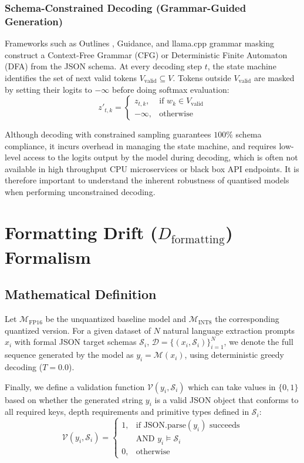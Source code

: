 \documentclass[10pt,journal,compsoc]{IEEEtran}
\begin{document}
\subsubsection{Schema-Constrained Decoding (Grammar-Guided Generation)}
Frameworks such as Outlines \cite{willard2023outlines}, Guidance, and llama.cpp grammar masking construct a Context-Free Grammar (CFG) or Deterministic Finite Automaton (DFA) from the JSON schema. At every decoding step $t$, the state machine identifies the set of next valid tokens $V_{\text{valid}} \subseteq V$. Tokens outside $V_{\text{valid}}$ are masked by setting their logits to $-\infty$ before doing softmax evaluation:
\begin{equation}
    z'_{t,k} = \begin{cases}
    z_{t,k}, & \text{if } w_k \in V_{\text{valid}} \\
    -\infty, & \text{otherwise}
    \end{cases}
    \label{eq:grammar_masking}
\end{equation}

Although decoding with constrained sampling guarantees $100\%$ schema compliance, it incurs overhead in managing the state machine, and requires low-level access to the logits output by the model during decoding, which is often not available in high throughput CPU microservices or black box API endpoints. It is therefore important to understand the inherent robustness of quantised models when performing unconstrained decoding.

\section{Formatting Drift ($D_{\text{formatting}}$) Formalism}

\subsection{Mathematical Definition}

Let $\mathcal{M}_{\text{FP16}}$ be the unquantized baseline model and $\mathcal{M}_{\text{INT8}}$ the corresponding quantized version. For a given dataset of $N$ natural language extraction prompts $x_i$ with formal JSON target schemas $\mathcal{S}_i$, $\mathcal{D} = \{(x_i, \mathcal{S}_i)\}_{i=1}^N$, we denote the full sequence generated by the model as $y_i = \mathcal{M}(x_i)$, using deterministic greedy decoding ($T=0.0$).

Finally, we define a validation function $\mathcal{V}(y_i, \mathcal{S}_i)$ which can take values in $\{0, 1\}$ based on whether the generated string $y_i$ is a valid JSON object that conforms to all required keys, depth requirements and primitive types defined in $\mathcal{S}_i$:
\begin{equation}
    \mathcal{V}(y_i, \mathcal{S}_i) = \begin{cases}
    1, & \text{if } \text{JSON.parse}(y_i) \text{ succeeds} \\
       & \text{AND } y_i \models \mathcal{S}_i \\
    0, & \text{otherwise}
    \end{cases}
\end{equation}
\end{document}
